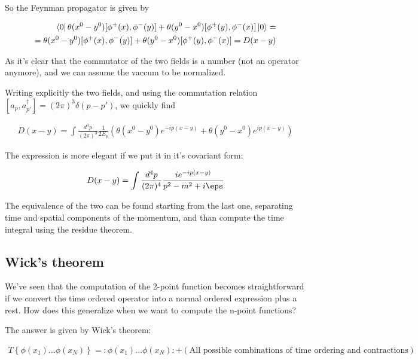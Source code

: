 \documentclass{report}
\begin{document}
{    So the Feynman propagator is given by 

    \begin{align}
        \bra{0}\theta(x^0-y^0)[\phi^+(x), \phi^-(y)] + \theta(y^0-x^0)[\phi^+(y), \phi^-(x)]\ket{0} = \\
        = \theta(x^0-y^0)[\phi^+(x), \phi^-(y)] + \theta(y^0-x^0)[\phi^+(y), \phi^-(x)] = D(x-y)
    \end{align}

    As it's clear that the commutator of the two fields is a number (not an operator anymore), and we can assume the vaccum to be normalized. 

    Writing explicitly the two fields, and using the commutation relation \([a_p, a^\dagger_{p'}] = (2\pi)^3\delta(p-p')\), we quickly find 

    \begin{align}
        D(x-y) = \int \frac{d^3 p}{(2\pi)^3}\frac{1}{2E_p}\left( \theta(x^0-y^0)e^{-ip(x-y)} + \theta(y^0-x^0)e^{ip(x-y)}\right)
    \end{align}

    The expression is more elegant if we put it in it's covariant form: 

    \begin{align}
        D(x-y) = \int \frac{d^4p}{(2\pi)^4}\frac{ie^{-ip(x-y)}}{p^2-m^2 +i\eps}
    \end{align}

    The equivalence of the two can be found starting from the last one, separating time and spatial components of the momentum, and than compute the time integral using the residue theorem. 
}

\subsection{Wick's theorem}

We've seen that the computation of the 2-point function becomes straightforward if we convert the time ordered operator into a normal ordered expression plus a rest. How does this generalize when we want to compute the n-point functions? 

The answer is given by Wick's theorem: 

\begin{align}
    T\left\{\phi(x_1)\ldots \phi(x_N) \right\} = :\phi(x_1)\ldots \phi(x_N): + \left(\text{All possible combinations of time ordering and contractions} \right) 
\end{align}
\end{document}
